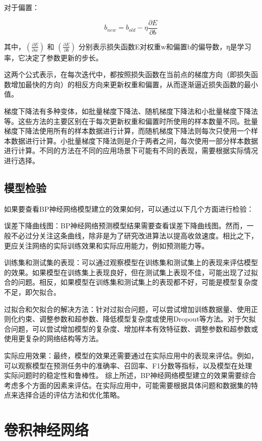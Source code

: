 对于偏置：

\begin{equation}
b_{new} = b_{old} - \eta \frac{\partial E}{\partial b}
\end{equation}

其中，$(\frac{\partial E}{\partial w})$ 和 $(\frac{\partial E}{\partial b})$ 分别表示损失函数E对权重w和偏置b的偏导数，η是学习率，它决定了参数更新的步长。

这两个公式表示，在每次迭代中，都按照损失函数在当前点的梯度方向（即损失函数增加最快的方向）的相反方向来更新权重和偏置，从而逐渐逼近损失函数的最小值。

梯度下降法有多种变体，如批量梯度下降法、随机梯度下降法和小批量梯度下降法等。这些方法的主要区别在于每次更新权重和偏置时所使用的样本数量不同。批量梯度下降法使用所有的样本数据进行计算，而随机梯度下降法则每次只使用一个样本数据进行计算。小批量梯度下降法则是介于两者之间，每次使用一部分样本数据进行计算。不同的方法在不同的应用场景下可能有不同的表现，需要根据实际情况进行选择。
\subsection{模型检验}

如果要查看BP神经网络模型建立的效果如何，可以通过以下几个方面进行检验：

误差下降曲线图：BP神经网络预测模型结果需要查看误差下降曲线图。然而，一般不必过分关注这条曲线，除非是为了研究改进算法以提高收敛速度。相比之下，更应关注网络的实际训练效果和实际应用能力，例如预测能力等。

训练集和测试集的表现：可以通过观察模型在训练集和测试集上的表现来评估模型的效果。如果模型在训练集上表现良好，但在测试集上表现不佳，可能出现了过拟合的问题。相反，如果模型在训练集和测试集上的表现都不好，可能是模型复杂度不足，即欠拟合。

过拟合和欠拟合的解决方法：针对过拟合问题，可以尝试增加训练数据量、使用正则化约束、调整参数和超参数、降低模型复杂度或使用Dropout等方法。对于欠拟合问题，可以尝试增加模型的复杂度、增加样本有效特征数、调整参数和超参数或使用更复杂的网络结构等方法。

实际应用效果：最终，模型的效果还需要通过在实际应用中的表现来评估。例如，可以观察模型在预测任务中的准确率、召回率、F1分数等指标，以及模型在处理实际问题时的稳定性和鲁棒性。
综上所述，BP神经网络模型建立的效果需要综合考虑多个方面的因素来评估。在实际应用中，可能需要根据具体问题和数据集的特点来选择合适的评估方法和优化策略。

\section{卷积神经网络}

